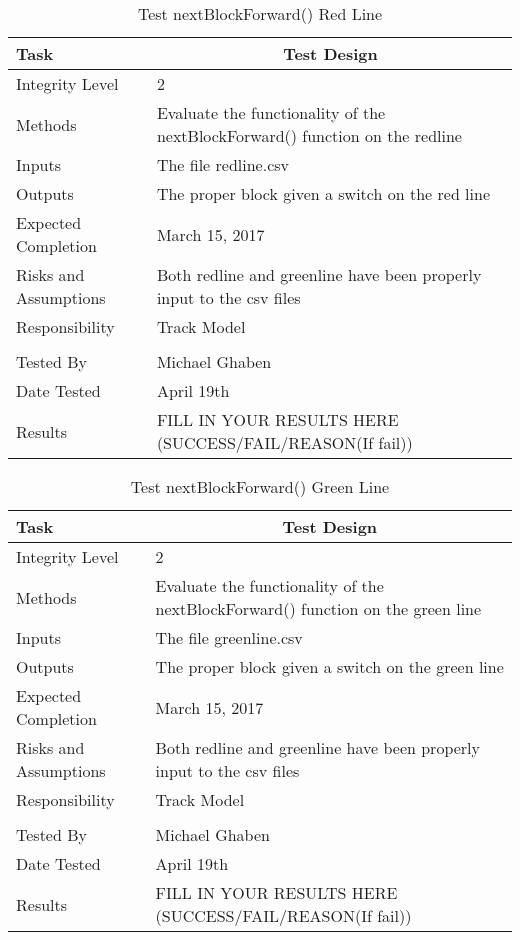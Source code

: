 \documentclass[]{article}
\begin{document}
\begin{table}[H]
	\centering
	\caption{Test nextBlockForward() Red Line}
	\begin{tabular}{|l|l|}
		\hline
		Task & \multicolumn{1}{c|}{Test Design} \\ \hline
		Integrity Level & 2 \\ \hline
		Methods & Evaluate the functionality of the nextBlockForward() function on the redline \\ \hline
		Inputs &  The file redline.csv \\ \hline
		Outputs &  The proper block given a switch on the red line\\ \hline
		Expected Completion & March 15, 2017\\ \hline
		Risks and Assumptions & Both redline and greenline have been properly input to the csv files \\ \hline
		Responsibility & Track Model\\ \hline
		\\ \hline
		Tested By   &  Michael Ghaben\\	\hline
		Date Tested & \parbox[t]{10cm}{April 19th}\\ \hline
		Results & FILL IN YOUR RESULTS HERE (SUCCESS/FAIL/REASON(If fail))\\ \hline
	\end{tabular}
\end{table}

\begin{table}[H]
	\centering
	\caption{Test nextBlockForward() Green Line}
	\begin{tabular}{|l|l|}
		\hline
		Task & \multicolumn{1}{c|}{Test Design} \\ \hline
		Integrity Level & 2 \\ \hline
		Methods & Evaluate the functionality of the nextBlockForward() function on the green line \\ \hline
		Inputs &  The file greenline.csv \\ \hline
		Outputs &  The proper block given a switch on the green line\\ \hline
		Expected Completion & March 15, 2017\\ \hline
		Risks and Assumptions & Both redline and greenline have been properly input to the csv files \\ \hline
		Responsibility & Track Model\\ \hline
		\\ \hline
		Tested By   &  Michael Ghaben\\	\hline
		Date Tested & \parbox[t]{10cm}{April 19th}\\ \hline
		Results & FILL IN YOUR RESULTS HERE (SUCCESS/FAIL/REASON(If fail))\\ \hline
	\end{tabular}
\end{table}
\end{document}
